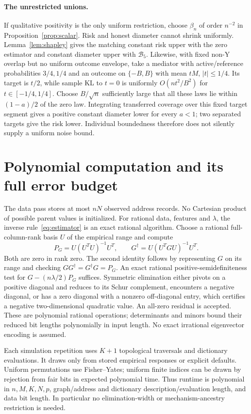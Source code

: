 \documentclass[11pt,a4paper]{article}
\numberwithin{equation}{section}
\theoremstyle{definition}
\begin{document}
\paragraph{The unrestricted unions.}
If qualitative positivity is the only uniform restriction, choose
$\beta_n$ of order $n^{-2}$ in Proposition~\ref{prop:scalar}. Risk and
honest diameter cannot shrink uniformly. Lemma~\ref{lem:shapley} gives
the matching constant risk upper with the zero estimator and constant
diameter upper with $\mathcal B_5$. Likewise, with fixed non-Y overlap
but no uniform outcome envelope, take a mediator with active/reference
probabilities $3/4,1/4$ and an outcome on $\{-B,B\}$ with mean $tM$,
$|t|\le1/4$. Its target is $t/2$, while sample KL to $t=0$ is uniformly
$O(nt^2/B^2)$ for $t\in[-1/4,1/4]$. Choose $B/\sqrt n$ sufficiently
large that all these laws lie within $(1-a)/2$ of the zero law.
Integrating transferred coverage over this fixed target segment gives
a positive constant diameter lower for every $a<1$; two separated
targets give the risk lower. Individual boundedness therefore
does not silently supply a uniform noise bound.

\section{Polynomial computation and its full error budget}\label{sec:computation}

The data pass stores at most $nN$ observed address records. No Cartesian
product of possible parent values is initialized. For rational data,
features and $\lambda$, the inverse rule~\eqref{eq:estimator} is an
exact rational algorithm. Choose a rational full-column-rank basis $U$
of the empirical range and compute
\[
 P_G=U(U^TU)^{-1}U^T,\qquad
 G^\dagger=U(U^TGU)^{-1}U^T.
\]
Both are zero in rank zero. The second identity follows by representing
$G$ on its range and checking $GG^\dagger=G^\dagger G=P_G$.
An exact rational positive-semidefiniteness test for
$G-(n\lambda/2)P_G$ suffices. Symmetric elimination either pivots on a
positive diagonal and reduces to its Schur complement, encounters a
negative diagonal, or has a zero diagonal with a nonzero off-diagonal
entry, which certifies a negative two-dimensional quadratic value.
An all-zero residual is accepted. These are polynomial rational
operations; determinants and minors bound their reduced bit lengths
polynomially in input length. No exact irrational eigenvector encoding
is assumed.

Each simulation repetition uses $K+1$ topological traversals and dictionary
evaluations. It draws only from stored empirical responses or explicit
defaults. Uniform permutations use Fisher--Yates; uniform finite indices
can be drawn by rejection from fair bits in expected polynomial time.
Thus runtime is polynomial in $n,M,K,N,p$, graph/address and dictionary
description/evaluation length, and data bit length. In particular no
elimination-width or mechanism-ancestry restriction is needed.
\end{document}
